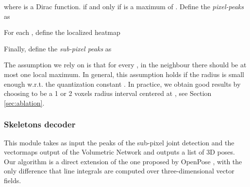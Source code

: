 \documentclass[a4paper,conference]{IEEEtran}
\begin{document}
where  is a Dirac function.  if and only if
 is a maximum of .
Define the \emph{pixel-peaks} as 

For each , define the localized heatmap

Finally, define the \emph{sub-pixel peaks} as 

The assumption we rely on is that for every , in the
neighbour  there should be at most one local maximum.
In general, this assumption holds if the radius is small enough 
w.r.t. the quantization constant . 
In practice, we obtain good results by choosing
 to be a 1 or 2 voxels radius interval centered at ,
see Section \ref{sec:ablation}.


\subsubsection{Skeletons decoder} 
This module takes as input the peaks 
 of the sub-pixel joint
detection and the vectormaps  
output of the Volumetric Network and
outputs a list of 3D poses. 
Our algorithm is a direct extension of the one proposed by OpenPose
\cite{cao2017realtime}, with the only difference that line integrals 
are computed over three-dimensional vector fields.
\end{document}
